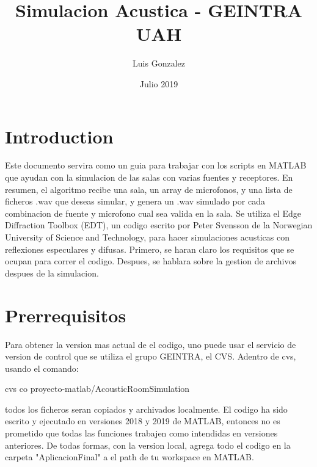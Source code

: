 \documentclass{article}
\title{Simulacion Acustica - GEINTRA UAH}
\author{Luis Gonzalez}
\date{Julio 2019}
\begin{document}
\maketitle

\section{Introduction}
Este documento servira como un guia para trabajar con los scripts en MATLAB que ayudan con la simulacion de las salas con varias fuentes y receptores. En resumen, el algoritmo recibe una sala, un array de microfonos, y una lista de ficheros .wav que deseas simular, y genera un .wav simulado por cada combinacion de fuente y microfono cual sea valida en la sala. Se utiliza el Edge Diffraction Toolbox (EDT), un codigo escrito por Peter Svensson de la Norwegian University of Science and Technology, para hacer simulaciones acusticas con reflexiones especulares y difusas. Primero, se haran claro los requisitos que se ocupan para correr el codigo. Despues, se hablara sobre la gestion de archivos despues de la simulacion.

\section{Prerrequisitos}
Para obtener la version mas actual de el codigo, uno puede usar el servicio de version de control que se utiliza el grupo GEINTRA, el CVS. Adentro de cvs, usando el comando:
\begin{center}
    cvs co proyecto-matlab/AcousticRoomSimulation
\end{center}
todos los ficheros seran copiados y archivados localmente. El codigo ha sido escrito y ejecutado en versiones 2018 y 2019 de MATLAB, entonces no es prometido que todas las funciones trabajen como intendidas en versiones anteriores. De todas formas, con la version local, agrega todo el codigo en la carpeta "AplicacionFinal" a el path de tu workspace en MATLAB.
\end{document}

